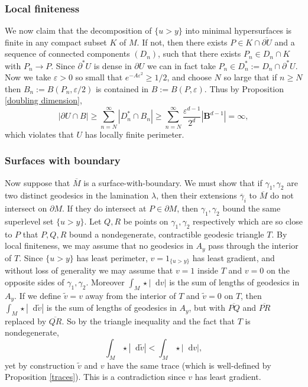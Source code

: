 \documentclass[reqno,10pt]{amsart}
\newcommand{\Ball}{\mathbf{B}}
\newcommand*\dif{\mathop{}\!\mathrm{d}}
\theoremstyle{definition}
\numberwithin{equation}{section}
\begin{document}
\subsubsection{Local finiteness}
We now claim that the decomposition of $\{u > y\}$ into minimal hypersurfaces is finite in any compact subset $K$ of $M$.
If not, then there exists $P \in K \cap \overline{\partial U}$ and a sequence of connected components $(D_n)$, such that there exists $P_n \in D_n \cap K$ with $P_n \to P$.
Since $\partial^* U$ is dense in $\partial U$ we can in fact take $P_n \in D_n^* := D_n \cap \partial^* U$.
Now we take $\varepsilon > 0$ so small that $e^{-A\varepsilon^2} \geq 1/2$, and choose $N$ so large that if $n \geq N$ then $B_n := B(P_n, \varepsilon/2)$ is contained in $B := B(P, \varepsilon)$.
Thus by Proposition \ref{doubling dimension},
$$|\partial U \cap B| \geq \sum_{n=N}^\infty |D_n^* \cap B_n| \geq \sum_{n=N}^\infty \frac{\varepsilon^{d - 1}}{2^d} |\Ball^{d - 1}| = \infty,$$
which violates that $U$ has locally finite perimeter.

\subsubsection{Surfaces with boundary}
Now suppose that $\overline M$ is a surface-with-boundary.
We must show that if $\gamma_1, \gamma_2$ are two distinct geodesics in the lamination $\lambda$, then their extensions $\overline \gamma_i$ to $\overline M$ do not intersect on $\partial M$.
If they do intersect at $P \in \partial M$, then $\gamma_1, \gamma_2$ bound the same superlevel set $\{u > y\}$.
Let $Q, R$ be points on $\gamma_1, \gamma_2$ respectively which are so close to $P$ that $P, Q, R$ bound a nondegenerate, contractible geodesic triangle $T$.
By local finiteness, we may assume that no geodesics in $A_y$ pass through the interior of $T$.
Since $\{u > y\}$ has least perimeter, $v = 1_{\{u > y\}}$ has least gradient, and without loss of generality we may assume that $v = 1$ inside $T$ and $v = 0$ on the opposite sides of $\gamma_1, \gamma_2$.
Moreover $\int_M \star |\dif v|$ is the sum of lengths of geodesics in $A_y$.
If we define $\tilde v = v$ away from the interior of $T$ and $\tilde v = 0$ on $T$, then $\int_M \star |\dif \tilde v|$ is the sum of lengths of geodesics in $A_y$, but with $\overline{PQ}$ and $\overline{PR}$ replaced by $\overline{QR}$.
So by the triangle inequality and the fact that $T$ is nondegenerate,
$$\int_M \star |\dif \tilde v| < \int_M \star |\dif v|,$$
yet by construction $\tilde v$ and $v$ have the same trace (which is well-defined by Proposition \ref{traces}).
This is a contradiction since $v$ has least gradient.
\end{document}
